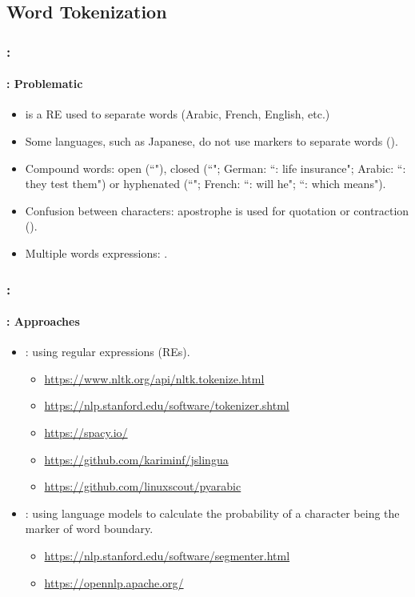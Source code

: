 \documentclass[xcolor=table]{beamer}
\begin{document}
\subsection{Word Tokenization}

\begin{frame}
	\frametitle{\insertshortsubtitle: \insertsection}
	\framesubtitle{\insertsubsection: Problematic} 

	\begin{itemize}
		\item \expword{/[ ]+/} is a RE used to separate words (Arabic, French, English, etc.)
		\item Some languages, such as Japanese, do not use markers to separate words ().
		\item Compound words: open (``"), closed (``"; German: ``: life insurance"; Arabic: ``: they test them") or hyphenated (``"; French: ``: will he"; ``: which means").
		\item Confusion between characters: apostrophe is used for quotation or contraction ().
		\item Multiple words expressions: .
	\end{itemize}

\end{frame}

\begin{frame}
	\frametitle{\insertshortsubtitle: \insertsection}
	\framesubtitle{\insertsubsection: Approaches}

	\begin{itemize}
		\item {}: using regular expressions (REs).
		\begin{itemize}
			\item \url{https://www.nltk.org/api/nltk.tokenize.html}
			\item \url{https://nlp.stanford.edu/software/tokenizer.shtml}
			\item \url{https://spacy.io/}
			\item \url{https://github.com/kariminf/jslingua}
			\item \url{https://github.com/linuxscout/pyarabic}
		\end{itemize}
		\item {}: using language models to calculate the probability of a character being the marker of word boundary.
		\begin{itemize}
			\item \url{https://nlp.stanford.edu/software/segmenter.html}
			\item \url{https://opennlp.apache.org/}
		\end{itemize}
	\end{itemize}

\end{frame}
\end{document}
